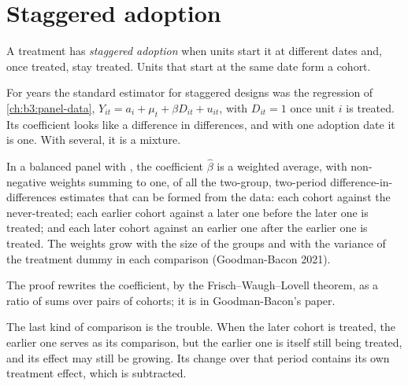 \section{Staggered adoption}\label{sec:b3:difference-in-differences:staggered}

\begin{definition}\label{def:b3:difference-in-differences:staggered}
A treatment has \emph{staggered adoption} when units start it at different
dates and, once treated, stay treated. Units that start at the same date form
a cohort.
\end{definition}

For years the standard estimator for staggered designs was the  regression of \cref{ch:b3:panel-data}, $Y_{it} = a_i + \mu_t + \beta
D_{it} + u_{it}$, with $D_{it} = 1$ once unit $i$ is treated. Its coefficient
looks like a difference in differences, and with one adoption date it is one.
With several, it is a mixture.

\begin{proposition}\label{prop:b3:difference-in-differences:bacon}
In a balanced panel with , the 
coefficient $\hat\beta$ is a weighted average, with non-negative weights summing
to one, of all the two-group, two-period difference-in-differences estimates
that can be formed from the data: each cohort against the never-treated; each
earlier cohort against a later one before the later one is treated; and each
later cohort against an earlier one after the earlier one is treated. The
weights grow with the size of the groups and with the variance of the
treatment dummy in each comparison (Goodman-Bacon 2021).
\end{proposition}

\admitted
The proof rewrites the  coefficient, by the
Frisch--Waugh--Lovell theorem, as a ratio of sums over pairs of cohorts; it
is in Goodman-Bacon's paper.

The last kind of comparison is the trouble. When the later cohort is treated,
the earlier one serves as its comparison, but the earlier one is itself still
being treated, and its effect may still be growing. Its change over that
period contains its own treatment effect, which is subtracted.

